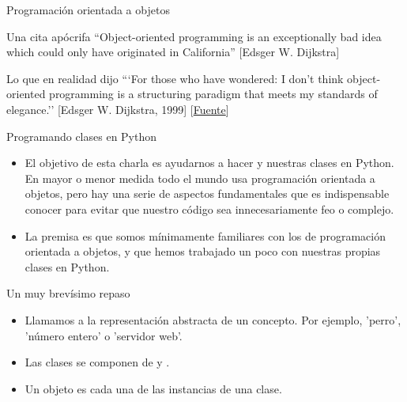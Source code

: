 
\begin{frame}{Programación orientada a objetos}
  \small
  \begin{block}{Una cita apócrifa}
    \centering
    ``Object-oriented programming is an exceptionally bad
    idea which could only have originated in California''
    [Edsger W. Dijkstra]
  \end{block}

  \small
  \begin{block}{Lo que en realidad dijo}
    \centering
    ```For those who have wondered: I don't think object-oriented
    programming is a structuring paradigm that meets my standards of
    elegance.'' [Edsger W. Dijkstra, 1999]
    [\href{http://www.cs.utexas.edu/users/EWD/transcriptions/EWD12xx/EWD1284.html}{Fuente}]
  \end{block}
\end{frame}

\begin{frame}{Programando clases en Python}
  \begin{itemize}
    \item El objetivo de esta charla es ayudarnos a hacer
       y  nuestras clases
      en Python. En mayor o menor medida todo el mundo usa
      programación orientada a objetos, pero hay una serie de aspectos
      fundamentales que es indispensable conocer para evitar que
      nuestro código sea innecesariamente feo o complejo.
    \item La premisa es que somos mínimamente familiares con los
       de programación orientada a
      objetos, y que hemos trabajado un poco con nuestras propias
      clases en Python.
  \end{itemize}
\end{frame}

\begin{frame}{Un muy brevísimo repaso}
  \begin{itemize}
    \item Llamamos  a la representación abstracta de un
      concepto. Por ejemplo, 'perro', 'número entero' o 'servidor web'.
    \item Las clases se componen de  y
      .
    \item Un objeto es cada una de las instancias de una clase.
  \end{itemize}
\end{frame}

